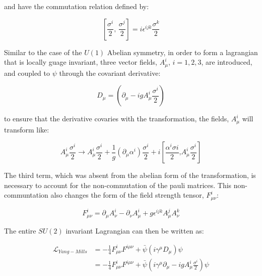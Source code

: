\noindent and have the commutation relation defined by:

\begin{equation}\label{eq:pauli_matrices_commutator}
[\frac{\sigma^{i}}{2}\text{, }\frac{\sigma^{j}}{2}] =
i\epsilon^{ijk}\frac{\sigma^{k}}{2}
\end{equation}

\par Similar to the case of the $U(1)$ Abelian symmetry, in order to form
a lagrangian that is locally guage invariant, three vector fields,
$A_{\mu}^{i}$, $i=1,2,3$, are introduced, and coupled to $\psi$
through the covariant derivative:

\begin{equation}\label{eq:yang_mills_covariant_derivative}
D_{\mu} = (\partial_{\mu} - igA_{\mu}^{i}\frac{\sigma^{i}}{2})
\end{equation}

\noindent to ensure that the derivative covaries with the
transformation, the fields, $A_{\mu}^{i}$ will transform like:

\begin{equation}\label{eq:yang_mills_vector_field_transformation}
A_{\mu}^{i}\frac{\sigma^{i}}{2} \rightarrow
A_{\mu}^{i}\frac{\sigma^{i}}{2} +
\frac{1}{g}(\partial_{\mu}\alpha^{i})\frac{\sigma
^{i}}{2} +
i[\frac{\alpha^{i}\sigma{i}}{2}\text{,
}A_{\mu}^{i}\frac{\sigma^{i}}{2}]
\end{equation}

\noindent The third term, which was absent from the abelian form of
the transformation, is necessary to account for the non-commutation of
the pauli matrices.  This non-communtation also changes the form of
the field strength tensor, $F_{\mu\nu}^{i}$:

\begin{equation}\label{eq:yang_mills_field_strength_tensor}
F_{\mu\nu}^{i} = \partial_{\mu}A_{\nu}^{i} - \partial_{\nu}A_{\mu}^{i} + g\epsilon^{ijk}A_{\mu}^{j}A_{\nu}^{k}
\end{equation}

\noindent The entire $SU(2)$ invariant Lagrangian can then be written
as:

\begin{equation}\label{eq:yang_mills_invariant_lagrangian}
\begin{aligned}
\mathcal{L}_{Yang-Mills} & = -\frac{1}{4}F_{\mu\nu}^{i}F^{i\mu\nu} +
\bar{\psi}(i\gamma^{\mu}D_{\mu})\psi \\
 & = -\frac{1}{4}F_{\mu\nu}^{i}F^{i\mu\nu} +
\bar{\psi}(i\gamma^{\mu}\partial_{\mu} -
igA_{\mu}^{i}\frac{\sigma^{i}}{2})\psi
\end{aligned}
\end{equation}

